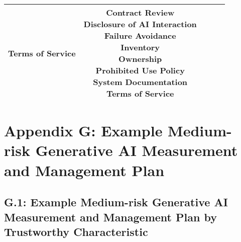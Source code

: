 \documentclass[fleqn]{article}
\begin{document}
\begin{landscape}
\begin{table}[H]
\begin{tabular}{|c|c|c|c|c|}
{			\textbullet\hspace{3pt} Terms of Service\\ 	
		} 
		& \makecell[l]{ 	
			\textbullet\hspace{3pt} Contract Review\\ 	
			\textbullet\hspace{3pt} Disclosure of AI Interaction\\ 	
			\textbullet\hspace{3pt} Failure Avoidance\\ 	
			\textbullet\hspace{3pt} Inventory\\ 	
			\textbullet\hspace{3pt} Ownership\\ 	
			\textbullet\hspace{3pt} Prohibited Use Policy\\ 	
			\textbullet\hspace{3pt} System Documentation\\ 	
			\textbullet\hspace{3pt} Terms of Service	\\ 	
		}\\
		\hline
	\end{tabular}
	\label{table:low_risk_plan_by_gai_risk_cont3}
\end{table}

\vfill
\raisebox{-10pt}{\makebox[\linewidth]{\thepage}}

\pagebreak
\thispagestyle{empty}

\section*{Appendix G: Example Medium-risk Generative AI Measurement and Management Plan}\label{sec:appndxg}

\subsection*{G.1: Example Medium-risk Generative AI Measurement and Management Plan by Trustworthy Characteristic}\label{appdxg1}


\end{landscape}
\end{document}
